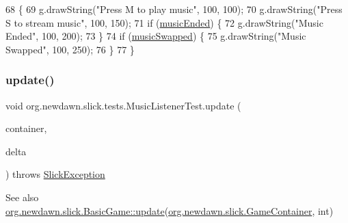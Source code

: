 \begin{DoxyCode}
68                                                                                   \{
69         g.drawString(\textcolor{stringliteral}{"Press M to play music"}, 100, 100);
70         g.drawString(\textcolor{stringliteral}{"Press S to stream music"}, 100, 150);
71         \textcolor{keywordflow}{if} (\mbox{\hyperlink{classorg_1_1newdawn_1_1slick_1_1tests_1_1_music_listener_test_ad701c702ddf8e4f55e1d6e2b9e8b25c7}{musicEnded}}) \{
72             g.drawString(\textcolor{stringliteral}{"Music Ended"}, 100, 200);
73         \}
74         \textcolor{keywordflow}{if} (\mbox{\hyperlink{classorg_1_1newdawn_1_1slick_1_1tests_1_1_music_listener_test_a00672f601ac67a12c1fb5218a89b1a6c}{musicSwapped}}) \{
75             g.drawString(\textcolor{stringliteral}{"Music Swapped"}, 100, 250);
76         \}
77     \}
\end{DoxyCode}
\mbox{\label{classorg_1_1newdawn_1_1slick_1_1tests_1_1_music_listener_test_ab964494387720fd726eedb546313ea16}} 
\subsubsection{\texorpdfstring{update()}{update()}}
{\footnotesize\ttfamily void org.\+newdawn.\+slick.\+tests.\+Music\+Listener\+Test.\+update (\begin{DoxyParamCaption}\item[{\mbox{\hyperlink{classorg_1_1newdawn_1_1slick_1_1_game_container}{Game\+Container}}}]{container,  }\item[{int}]{delta }\end{DoxyParamCaption}) throws \mbox{\hyperlink{classorg_1_1newdawn_1_1slick_1_1_slick_exception}{Slick\+Exception}}\hspace{0.3cm}{\ttfamily [inline]}}

\begin{DoxySeeAlso}{See also}
\mbox{\hyperlink{classorg_1_1newdawn_1_1slick_1_1_basic_game_acfe6fa05aef83bff1631af91a3e4bd20}{org.\+newdawn.\+slick.\+Basic\+Game\+::update}}(\mbox{\hyperlink{classorg_1_1newdawn_1_1slick_1_1_game_container}{org.\+newdawn.\+slick.\+Game\+Container}}, int) 
\end{DoxySeeAlso}


